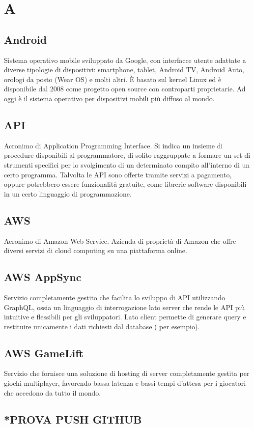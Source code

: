 \section*{A}
\markright{}
\subsection*{Android}
Sistema operativo mobile sviluppato da Google, con interfacce utente adattate a diverse tipologie di dispositivi: smartphone, tablet, Android TV, Android Auto, orologi da posto (Wear OS) e molti altri. È basato sul kernel Linux ed è disponibile dal 2008 come progetto open source con controparti proprietarie. Ad oggi è il sistema operativo per dispositivi mobili più diffuso al mondo.
\subsection*{API}
Acronimo di Application Programming Interface. Si indica un  insieme  di  procedure disponibili al programmatore, di solito  raggruppate a formare un set di strumenti specifici per lo svolgimento di un determinato compito all’interno di un certo programma. Talvolta le API sono offerte tramite servizi a pagamento, oppure potrebbero essere funzionalità gratuite, come librerie software disponibili in un certo linguaggio di programmazione.
\subsection*{AWS}
Acronimo di Amazon Web Service. Azienda di proprietà di Amazon che offre diversi servizi di cloud computing su una piattaforma online.
\subsection*{AWS AppSync}
Servizio  completamente gestito che facilita lo sviluppo di API utilizzando GraphQL, ossia un linguaggio di interrogazione lato server che rende le API più intuitive e flessibili per gli sviluppatori. Lato client permette di generare query e restituire unicamente i dati richiesti dal database ( per esempio).  
\subsection*{AWS GameLift}
Servizio  che fornisce una soluzione di hosting di server completamente gestita per giochi multiplayer, favorendo bassa latenza e bassi tempi d'attesa per i giocatori che accedono da tutto il mondo.  

\subsection{*PROVA PUSH GITHUB}
